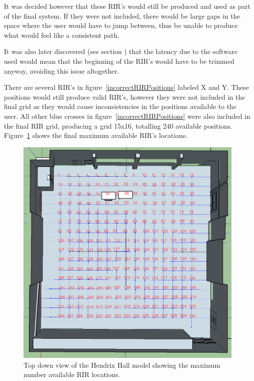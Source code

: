 \documentclass[../../main.tex]{subfiles}
\begin{document}
			It was decided however that these \ac{RIR}'s would still be produced and used as part of the final system. If they were not included, there would be large gaps in the space where the user would have to jump between, thus be unable to produce what would feel like a consistent path.

			It was also later discovered (see section ) that the latency due to the software used would mean that the beginning of the \ac{RIR}'s would have to be trimmed anyway, avoiding this issue altogether.

			There are several \ac{RIR}'s in figure~\ref{incorrectRIRPositions} labeled X and Y. These positions would still produce valid \ac{RIR}'s, however they were not included in the final grid as they would cause inconsistencies in the positions available to the user. All other blue crosses in figure~\ref{incorrectRIRPositions} were also included in the final \ac{RIR} grid, producing a grid 15x16, totalling 240 available positions. Figure~\ref{bulkRIRs} shows the final maximum available \ac{RIR}'s locations.

			\begin{figure}[H]
				\centerline{\includegraphics[scale = 0.37]{Sections/Implementation/Odeon/images/RIRPositions/RIR_Position_Bulk.png}}
				\caption{Top down view of the Hendrix Hall model showing the maximum number available \ac{RIR} locations.}
				\label{bulkRIRs}
			\end{figure}
\end{document}
